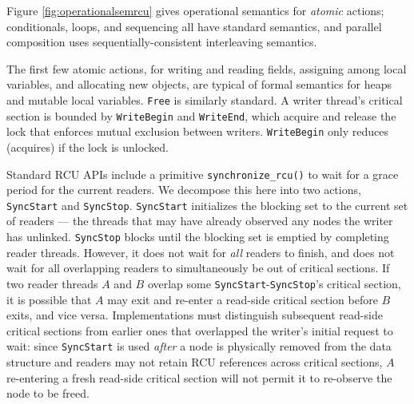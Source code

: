 Figure \ref{fig:operationalsemrcu} gives operational semantics for \emph{atomic} actions; conditionals, loops, and sequencing all have standard semantics, and parallel composition uses sequentially-consistent interleaving semantics.

The first few atomic actions, for writing and reading fields, assigning among local variables, and allocating new objects, are typical of formal semantics for heaps and mutable local variables. \lstinline|Free| is similarly standard.
%
A writer thread's critical section is bounded by \lstinline|WriteBegin| and \lstinline|WriteEnd|, which acquire and release the lock that enforces mutual exclusion between writers.  \lstinline|WriteBegin| only reduces (acquires) if the lock is \textsf{unlocked}.

Standard RCU APIs include a primitive \texttt{synchronize\_rcu()} to wait for a grace period for the current readers.  We decompose this here into two actions, \lstinline|SyncStart| and \lstinline|SyncStop|.
\lstinline|SyncStart| initializes the blocking set to the current set of readers --- the threads that may have already observed any nodes the writer has unlinked.
\lstinline|SyncStop| blocks until the blocking set is emptied by completing reader threads. However, it does not wait for \emph{all} readers to finish, and does not wait for all overlapping readers to simultaneously be out of critical sections. If two reader threads $A$ and $B$ overlap some \lstinline|SyncStart|-\lstinline|SyncStop|'s critical section, it is possible that $A$ may exit and re-enter a read-side critical section before $B$ exits, and vice versa.  Implementations must distinguish subsequent read-side critical sections from earlier ones that overlapped the writer's initial request to wait: since \lstinline|SyncStart| is used \emph{after} a node is physically removed from the data structure and readers may not retain RCU references across critical sections, $A$ re-entering a fresh read-side critical section will not permit it to re-observe the node to be freed.

